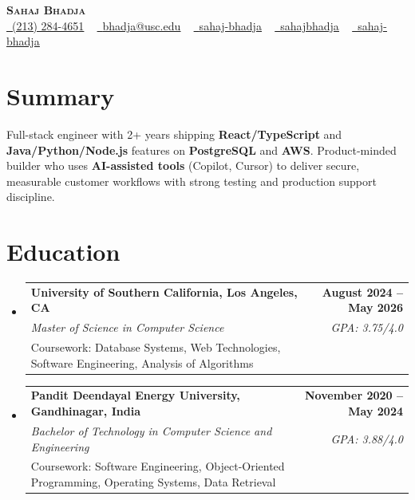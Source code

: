 \documentclass[letterpaper,10pt]{article}
\makeatletter
\newcommand{\resumeEduSubheading}[5]{\vspace{-1pt}\item\begin{tabular*}{1.0\textwidth}[t]{l@{\extracolsep{\fill}}r}\textbf{#1} & \textbf{\small #2} \\\textit{\small #3} & \textit{\small #4} \\\small #5 & \\\end{tabular*}\vspace{-4pt}}
\newcommand{\resumeSubHeadingListStart}{\begin{itemize}[leftmargin=0.0in, label={}]}
\newcommand{\resumeSubHeadingListEnd}{\end{itemize}}
\makeatother
\begin{document}
\begin{center}
{\Huge \scshape \textbf{Sahaj Bhadja}} \\ \vspace{1pt}
\small \href{tel:(213) 284-4651}{\faPhone\ \underline{(213) 284-4651}} ~ \href{mailto:bhadja@usc.edu}{\raisebox{-0.2\height}\faEnvelope\ \underline{bhadja@usc.edu}} ~
\href{https://www.linkedin.com/in/sahaj-bhadja/}{\raisebox{-0.2\height}\faLinkedin\ \underline{sahaj-bhadja}} ~ \href{https://github.com/SAHAJ-BHADJA}{\raisebox{-0.2\height}\faGithub\ \underline{sahajbhadja}} ~
\href{https://sahaj-bhadja.vercel.app/}{\raisebox{-0.2\height}\faGlobe\ \underline{sahaj-bhadja}}
\end{center}
\vspace{-18pt}
\section{Summary}
\begin{itemize}[leftmargin=0.15in, label={}]
\small{\item{Full-stack engineer with 2+ years shipping \textbf{React/TypeScript} and \textbf{Java/Python/Node.js} features on \textbf{PostgreSQL} and \textbf{AWS}. Product-minded builder who uses \textbf{AI-assisted tools} (Copilot, Cursor) to deliver secure, measurable customer workflows with strong testing and production support discipline.}}
\end{itemize}
\vspace{-16pt}
\section{Education}
\resumeSubHeadingListStart
\resumeEduSubheading{University of Southern California, Los Angeles, CA}{August 2024 -- May 2026}{Master of Science in Computer Science}{GPA: 3.75/4.0}{Coursework: Database Systems, Web Technologies, Software Engineering, Analysis of Algorithms}
\vspace{-9pt}
\resumeEduSubheading{Pandit Deendayal Energy University, Gandhinagar, India}{November 2020 -- May 2024}{Bachelor of Technology in Computer Science and Engineering}{GPA: 3.88/4.0}{Coursework: Software Engineering, Object-Oriented Programming, Operating Systems, Data Retrieval}
\resumeSubHeadingListEnd
\vspace{-14pt}
\end{document}
